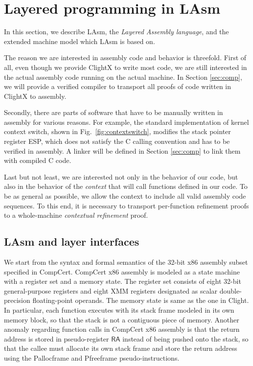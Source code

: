 
\section{Layered programming in LAsm}
\label{sec:seq:lasm}

In this section, we describe LAsm, the \emph{Layered
  Assembly language}, and the extended machine model which LAsm is based on.

The reason we are interested in assembly code and behavior is
threefold.  First of all, even though we provide ClightX to write most
code, we are still interested in the actual assembly code running on
the actual machine. In Section \ref{sec:comp}, we will provide a
verified compiler to transport all proofs of code written in ClightX
to assembly.

Secondly, there are parts of software that have to be manually written
in assembly for various reasons. For example, the standard
implementation of kernel context switch, shown in
Fig.~\ref{fig:contextswitch}, 
modifies the stack pointer register
\textsf{ESP}, which does not satisfy the C calling convention and has
to be verified in assembly.  A linker will be defined in Section
\ref{sec:comp} to link them with compiled C code.

Last but not least, we are interested not only in the behavior of our
code, but also in the behavior of the \emph{context} that will call
functions defined in our code. To be as general as possible, we allow
the context to include all valid assembly code sequences. To this end,
it is necessary to transport per-function refinement proofs to a
whole-machine \emph{contextual refinement} proof.


  \subsection{LAsm and layer interfaces}

We start from the syntax and formal semantics of the 32-bit x86
assembly subset specified in CompCert.
CompCert x86 assembly is
modeled as a state machine with a register set and a memory state. 
The register set
consists of eight 32-bit general-purpose registers and eight XMM registers
designated as scalar double-precision floating-point operands.
The memory state is same as the one in Clight.
In particular, each function executes with its stack frame modeled in its
own memory block, so that the stack is not a contiguous piece of
memory.
Another anomaly regarding function calls in CompCert x86 assembly is that
the return address is stored in pseudo-register $\mathsf{RA}$ instead of
being pushed onto the stack, so
that the callee must allocate its own stack frame and
store the return address%
using the \textsf{Pallocframe} and
\textsf{Pfreeframe} pseudo-instructions.

